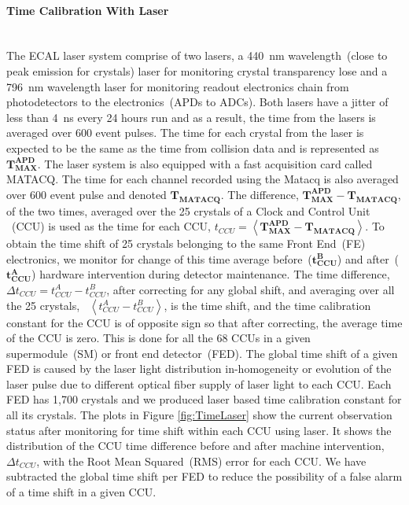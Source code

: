 \paragraph{Time Calibration With Laser}\mbox{}\\
The ECAL laser system comprise of two lasers, a 440~nm wavelength~(close to peak emission for \pb crystals) laser for monitoring crystal transparency lose and a 796~nm wavelength laser for monitoring readout electronics chain from photodetectors to the electronics~(\ie APDs to ADCs). Both lasers have a jitter of less than 4~ns every 24 hours run and as a result, the time from the lasers is averaged over 600 event pulses. The time for each crystal from the laser is expected to be the same as the time from collision data and is represented as $\mathbf{T^{APD}_{MAX}}$. The laser system is also equipped with a fast acquisition card called MATACQ. The time for each channel recorded using the Matacq is also averaged over 600 event pulse and denoted  $\mathbf{T_{MATACQ}}$.
The difference, $ \mathbf{T^{APD}_{MAX}} - \mathbf{T_{MATACQ}}$, of the two times, averaged over the  25 crystals of a Clock and Control Unit ~(CCU) is used as the time for each CCU, $ t_{CCU} = \left\langle \mathbf{T^{APD}_{MAX} - T_{MATACQ}} \right\rangle $. 
To obtain the time shift of 25 crystals belonging to the same Front End~(FE) electronics, we monitor for change of this time average  before~($\mathbf{t^{B}_{CCU}} $) and after~($\mathbf{t^{A}_{CCU}} $) hardware intervention during detector maintenance.  
The time difference, $\Delta t_{CCU} = t^{A}_{CCU} - t^{B}_{CCU}$, after correcting for any global shift, and averaging over all the 25 crystals, \ie ~$\left\langle t^{A}_{CCU} - t^{B}_{CCU} \right\rangle $, is the time shift, and the time calibration constant for the CCU is of opposite sign so that after correcting, the average time of the CCU is zero. This is done for all the 68 CCUs in a given supermodule~(SM) or front end detector~(FED). The global time shift of a given FED is caused by the laser light distribution in-homogeneity  or evolution of the laser pulse due to different optical fiber supply of laser light to each CCU. Each FED has 1,700 \pb crystals and we produced laser based time calibration constant for all its crystals. 
The plots in Figure \ref{fig:TimeLaser} show the current observation status after monitoring for time shift within each CCU using laser. It shows the distribution of the CCU time difference before and after machine intervention, $\Delta t_{CCU}$, with the Root Mean Squared~(RMS) error for each CCU. We have subtracted the global time shift per FED to reduce the possibility of a false alarm of a time shift in a given CCU.
